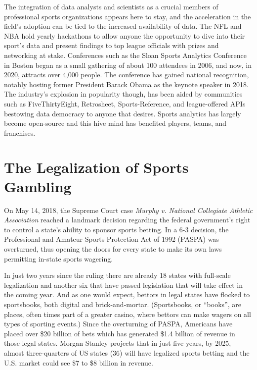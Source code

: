 \documentclass [MS] {uclathes}
\begin{document}
The integration of data analysts and scientists as a crucial members of professional sports organizations appears here to stay, and the acceleration in the field's adoption can be tied to the increased availability of data. The NFL and NBA hold yearly hackathons to allow anyone the opportunity to dive into their sport's data and present findings to top league officials with prizes and networking at stake. Conferences such as the Sloan Sports Analytics Conference in Boston began as a small gathering of about 100 attendees in 2006, and now, in 2020, attracts over 4,000 people. The conference has gained national recognition, notably hosting former President Barack Obama as the keynote speaker in 2018. The industry's explosion in popularity though, has been aided by communities such as FiveThirtyEight, Retrosheet, Sports-Reference, and league-offered APIs bestowing data democracy to anyone that desires. Sports analytics has largely become open-source and this hive mind has benefited players, teams, and franchises. 

 \section{The Legalization of Sports Gambling}
On May 14, 2018, the Supreme Court case \emph{Murphy v. National Collegiate Athletic Association} reached a landmark decision regarding the federal government's right to control a state's ability to sponsor sports betting. In a 6-3 decision, the Professional and Amateur Sports Protection Act of 1992 (PASPA) was overturned, thus opening the doors for every state to make its own laws permitting in-state sports wagering. 

In just two years since the ruling there are already 18 states with full-scale legalization and another six that have passed legislation that will take effect in the coming year. \cite{betmap} And as one would expect, bettors in legal states have flocked to sportsbooks, both digital and brick-and-mortar. (Sportsbooks, or ``books'', are places, often times part of a greater casino, where bettors can make wagers on all types of sporting events.) Since the overturning of PASPA, Americans have placed over \$20 billion of bets which has generated \$1.4 billion of revenue in those legal states. \cite{betrevenue} Morgan Stanley projects that in just five years, by 2025, almost three-quarters of US states (36) will have legalized sports betting and the U.S. market could see \$7 to \$8 billion in revenue. \cite{market} 
\end{document}
